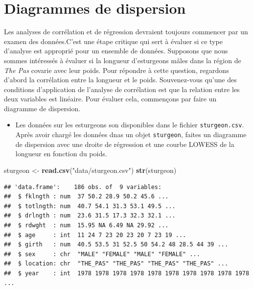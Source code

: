 \documentclass[
  12pt,
]{book}
\newenvironment{Shaded}{\begin{snugshade}}{\end{snugshade}}
\newcommand{\KeywordTok}[1]{\textcolor[rgb]{0.13,0.29,0.53}{\textbf{#1}}}
\newcommand{\NormalTok}[1]{#1}
\newcommand{\StringTok}[1]{\textcolor[rgb]{0.31,0.60,0.02}{#1}}
\providecommand{\tightlist}{%
  \setlength{\itemsep}{0pt}\setlength{\parskip}{0pt}}
\begin{document}
\hypertarget{diagrammes-de-dispersion}{%
\section{Diagrammes de dispersion}\label{diagrammes-de-dispersion}}

Les analyses de corrélation et de régression devraient toujours commencer par un examen des données.C'est une étape critique qui sert à évaluer si ce type d'analyse est approprié pour un ensemble de données.
Supposons que nous sommes intéressés à évaluer si la longueur d'esturgeons mâles dans la région de \emph{The Pas} covarie avec leur poids.
Pour répondre à cette question, regardons d'abord la corrélation entre
la longueur et le poids.
Souvenez-vous qu'une des conditions d'application de l'analyse de
corrélation est que la relation entre les deux variables est linéaire. Pour
évaluer cela, commençons par faire un diagramme de dispersion.

\begin{itemize}
\tightlist
\item
  Les données sur les esturgeons son disponibles dans le fichier \texttt{sturgeon.csv}.
  Après avoir chargé les données dnas un objet \texttt{sturgeon}, faites un diagramme de dispersion avec une droite de régression et une courbe LOWESS de la longueur en fonction du poids.
\end{itemize}

\begin{Shaded}
\begin{Highlighting}[]
\NormalTok{sturgeon \textless{}{-}}\StringTok{ }\KeywordTok{read.csv}\NormalTok{(}\StringTok{"data/sturgeon.csv"}\NormalTok{)}
\KeywordTok{str}\NormalTok{(sturgeon)}
\end{Highlighting}
\end{Shaded}

\begin{verbatim}
## 'data.frame':    186 obs. of  9 variables:
##  $ fklngth : num  37 50.2 28.9 50.2 45.6 ...
##  $ totlngth: num  40.7 54.1 31.3 53.1 49.5 ...
##  $ drlngth : num  23.6 31.5 17.3 32.3 32.1 ...
##  $ rdwght  : num  15.95 NA 6.49 NA 29.92 ...
##  $ age     : int  11 24 7 23 20 23 20 7 23 19 ...
##  $ girth   : num  40.5 53.5 31 52.5 50 54.2 48 28.5 44 39 ...
##  $ sex     : chr  "MALE" "FEMALE" "MALE" "FEMALE" ...
##  $ location: chr  "THE_PAS" "THE_PAS" "THE_PAS" "THE_PAS" ...
##  $ year    : int  1978 1978 1978 1978 1978 1978 1978 1978 1978 1978 ...
\end{verbatim}
\end{document}
